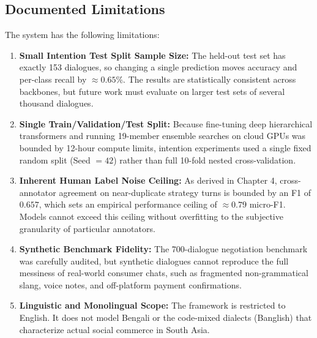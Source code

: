 \subsection{Documented Limitations}
The system has the following limitations:
\begin{enumerate}
  \item \textbf{Small Intention Test Split Sample Size:} The held-out test set has exactly 153 dialogues, so changing a single prediction moves accuracy and per-class recall by $\approx 0.65\%$. The results are statistically consistent across backbones, but future work must evaluate on larger test sets of several thousand dialogues.
  \item \textbf{Single Train/Validation/Test Split:} Because fine-tuning deep hierarchical transformers and running 19-member ensemble searches on cloud GPUs was bounded by 12-hour compute limits, intention experiments used a single fixed random split (Seed $= 42$) rather than full 10-fold nested cross-validation.
  \item \textbf{Inherent Human Label Noise Ceiling:} As derived in Chapter 4, cross-annotator agreement on near-duplicate strategy turns is bounded by an F1 of $0.657$, which sets an empirical performance ceiling of $\approx 0.79$ micro-F1. Models cannot exceed this ceiling without overfitting to the subjective granularity of particular annotators.
  \item \textbf{Synthetic Benchmark Fidelity:} The 700-dialogue negotiation benchmark was carefully audited, but synthetic dialogues cannot reproduce the full messiness of real-world consumer chats, such as fragmented non-grammatical slang, voice notes, and off-platform payment confirmations.
  \item \textbf{Linguistic and Monolingual Scope:} The framework is restricted to English. It does not model Bengali or the code-mixed dialects (Banglish) that characterize actual social commerce in South Asia.
\end{enumerate}

